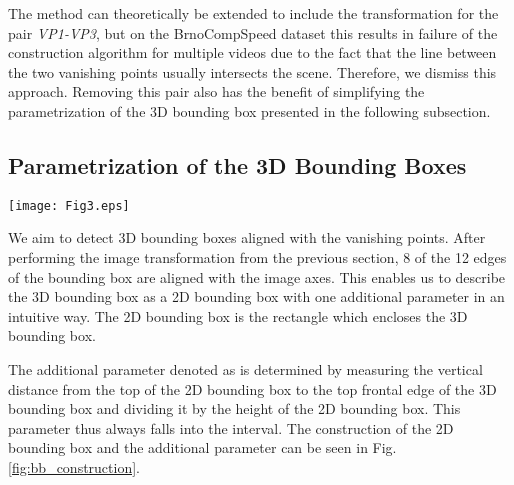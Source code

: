 \documentclass[twocolumn]{svjour3}          \smartqed  \usepackage{graphicx}
\begin{document}
The method can theoretically be extended to include the transformation for the pair \textit{VP1-VP3}, but on the BrnoCompSpeed dataset this results in failure of the construction algorithm for multiple videos due to the fact that the line between the two vanishing points usually intersects the scene. Therefore, we dismiss this approach. Removing this pair also has the benefit of simplifying the parametrization of the 3D bounding box presented in the following subsection.

\subsection{Parametrization of the 3D Bounding Boxes}

\begin{figure*}[t]
   \centering
   \texttt{[image: Fig3.eps]}
   \caption{The process of constructing 2D bounding box with the  parameter from a 3D bounding box using the transformation for both pairs for a vehicle from the BoxCars dataset \cite{boxcars}. \textbf{a)} 3D bounding box (green) which is aligned with \textit{VP1} (yellow), \textit{VP2} (blue) and \textit{VP3} (red). \textbf{b)} 3D bounding box. \textbf{c)} 3D bouding box after the perspective transform for the pair \textit{VP2-VP3} is applied. \textbf{d)} The parametrization of the 3D bouding box for the pair \textit{VP2-VP3} as a 2D bouding box (green) with the parameter  is determined as the ratio of the distance from top of the 2D bounding box to the top-front edge of the transformed 3D bounding box (blue) and the height of the 2D bouding box. \textbf{e)} 3D bouding box after the perspective transform for the pair \textit{VP1-VP2} is applied. \textbf{f)} The parametrization of the 3D bouding box for the pair \textit{VP1-VP2}.}
   \label{fig:bb_construction}
\end{figure*}

We aim to detect 3D bounding boxes aligned with the vanishing points. After performing the image transformation from the previous section, 8 of the 12 edges of the bounding box are aligned with the image axes. This enables us to describe the 3D bounding box as a 2D bounding box with one additional parameter in an intuitive way. The 2D bounding box is the rectangle which encloses the 3D bounding box. 

The additional parameter denoted as  is determined by measuring the vertical distance from the top of the 2D bounding box to the top frontal edge of the 3D bounding box and dividing it by the height of the 2D bounding box. This parameter thus always falls into the  interval. The construction of the 2D bounding box and the additional parameter can be seen in Fig. \ref{fig:bb_construction}.
\end{document}
